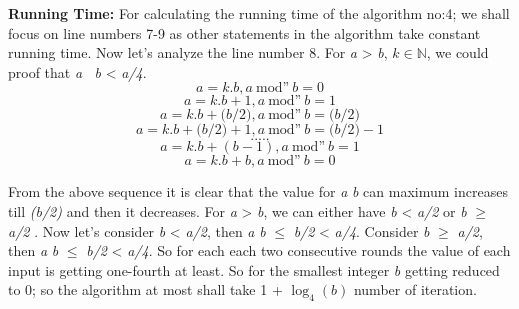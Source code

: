 \documentclass[conference]{IEEEtran}
\newcommand{\N}{{\mathbb N}}
\newcommand{\var}[1]{\textit{#1}}
\newcommand{\moddashdash}{\text{mod''}}
\begin{document}
\textbf{Running Time:}
For calculating the running time of the algorithm no:4; we shall focus on line numbers 7-9 as 
other statements in the algorithm take constant running time. Now let's analyze the line number 8.\linebreak
For \var{a} > \var{b}, $k\in\N$, we could proof that \var{a} \moddashdash $\>$ \var{b} < \var{a/4}.
\begin{equation*} 
\var{a} = \var{k.}\var{b}, \var{a} \> \moddashdash \> \var{b}  = 0
\end{equation*}
\begin{equation*} 
\var{a} = \var{k.}\var{b} + 1, \var{a} \> \moddashdash \> \var{b}  = 1
\end{equation*} 
\begin{equation*}
\var{a} = \var{k.}\var{b} + \var(b/2), \var{a} \>  \moddashdash \>  \var{b}  = \var(b/2)
\end{equation*} 
\begin{equation*}
\var{a} = \var{k.}\var{b} + \var(b/2) + 1, \var{a} \>  \moddashdash \>  \var{b}  = \var(b/2) -1
\end{equation*} 
\begin{equation*}
.....
\end{equation*} 
\begin{equation*}
\var{a} = \var{k.}\var{b} + (b - 1), \var{a} \>  \moddashdash \>  \var{b}  = 1
\end{equation*} 
\begin{equation*}
\var{a} = \var{k.}\var{b} + b, \var{a} \>  \moddashdash \>  \var{b}  = 0
\end{equation*} 

From the above sequence it is clear that the value for \var{a} \moddashdash \var{b} can maximum increases till \var{(b/2)} and then it decreases. For \var{a} > \var{b}, we can either have \var{b} <
\var{a/2} or \var{b} $\geq$ \var{a/2} . Now let's consider \var{b} < \var{a/2}, then \var{a} \moddashdash \var{b} $\leq$ \var{b/2} < \var{a/4}.
Consider \var{b} $\geq$ \var{a/2}, then \var{a} \moddashdash \var{b} $\leq$ \var{b/2} < \var{a/4}.
So for each each two consecutive rounds the value of each input is getting one-fourth at least.
So for the smallest integer \var{b} getting reduced to 0; so the algorithm at most shall take 1 + $\log_4(b)$ number of iteration.
\end{document}
